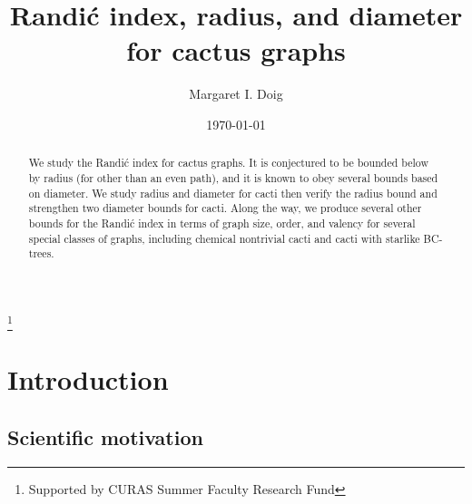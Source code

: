 \documentclass{amsart}
\theoremstyle{definition}
\begin{document}
\title{Randi\'c index, radius, and diameter for cactus graphs}


\author[M. Doig]{Margaret I. Doig}
\address{Department of Mathematics, Creighton University}
\date{\today}

\thanks{Supported by CURAS Summer Faculty Research Fund}

\begin{abstract}
We study the Randi\'c index for cactus graphs. It is conjectured to be bounded below by radius (for other than an even path), and it is known to obey several bounds based on diameter. We study radius and diameter for cacti then verify the radius bound and strengthen two diameter bounds for cacti. Along the way, we produce several other bounds for the Randi\'c index in terms of graph size, order, and valency for several special classes of graphs, including chemical nontrivial cacti and cacti with starlike BC-trees.
\end{abstract}

\maketitle





\section{Introduction}


\subsection*{Scientific motivation} 
\end{document}
